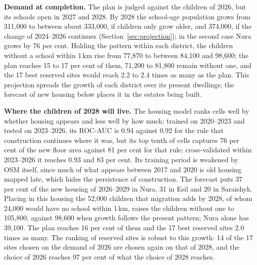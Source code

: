 \textbf{Demand at completion.} The plan is judged against the children of 2026, but its schools open in 2027 and 2028. By 2028 the school-age population grows from 311,000 to between about 333,000, if children only grow older, and 374,000, if the change of 2024--2026 continues (Section~\ref{sec:projection}); in the second case Nura grows by 76 per cent. Holding the pattern within each district, the children without a school within 1\,km rise from 77,870 to between 84,100 and 98,600; the plan reaches 15 to 17 per cent of them, 71,200 to 81,800 remain without one, and the 17 best reserved sites would reach 2.2 to 2.4 times as many as the plan. This projection spreads the growth of each district over its present dwellings; the forecast of new housing below places it in the estates being built.

\textbf{Where the children of 2028 will live.} The housing model ranks cells well by whether housing appears and less well by how much: trained on 2020--2023 and tested on 2023--2026, its ROC-AUC is 0.94 against 0.92 for the rule that construction continues where it was, but its top tenth of cells captures 76 per cent of the new floor area against 81 per cent for that rule; cross-validated within 2023--2026 it reaches 0.93 and 83 per cent. Its training period is weakened by OSM itself, since much of what appears between 2017 and 2020 is old housing mapped late, which hides the persistence of construction. The forecast puts 37 per cent of the new housing of 2026--2029 in Nura, 31 in Esil and 20 in Saraishyk. Placing in this housing the 52,000 children that migration adds by 2028, of whom 24,000 would have no school within 1\,km, raises the children without one to 105,800, against 98,600 when growth follows the present pattern; Nura alone has 39,100. The plan reaches 16 per cent of them and the 17 best reserved sites 2.0 times as many. The ranking of reserved sites is robust to this growth: 14 of the 17 sites chosen on the demand of 2026 are chosen again on that of 2028, and the choice of 2026 reaches 97 per cent of what the choice of 2028 reaches.

